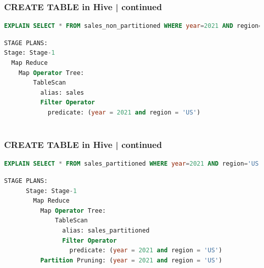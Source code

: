 \begin{frame}[fragile]
	\frametitle{CREATE TABLE in Hive | continued}
	\vspace{-0.6cm}
	\begin{tcolorbox}[colback=white,colframe=black,title= Part 5: Table Partitions]
	\small
	\vspace{-0.3cm}
\begin{lstlisting}[caption={Explain Plan Command for Non-Partitioned Table },language=SQL]
EXPLAIN SELECT * FROM sales_non_partitioned WHERE year=2021 AND region='US';
\end{lstlisting}
\vspace{-0.5cm}
\begin{lstlisting}[caption={Explain Plan Command for Non-Partitioned Table },language=SQL]
STAGE PLANS:
Stage: Stage-1
  Map Reduce
    Map Operator Tree:
        TableScan
          alias: sales
          Filter Operator
            predicate: (year = 2021 and region = 'US')
 
\end{lstlisting}
\end{tcolorbox}
	
\end{frame}
\begin{frame}[fragile]
	\frametitle{CREATE TABLE in Hive | continued}
	\vspace{-0.6cm}
	\begin{tcolorbox}[colback=white,colframe=black,title= Part 5: Table Partitions]
	\small
	\vspace{-0.3cm}
\begin{lstlisting}[caption={Explain Plan Command for Partitioned Table },language=SQL]
EXPLAIN SELECT * FROM sales_partitioned WHERE year=2021 AND region='US';
\end{lstlisting}
	\vspace{-0.5cm}
\begin{lstlisting}[caption={Explain Plan Command for Partitioned Table },language=SQL]
    STAGE PLANS:
      Stage: Stage-1
        Map Reduce
          Map Operator Tree:
              TableScan
                alias: sales_partitioned
                Filter Operator
                  predicate: (year = 2021 and region = 'US')
          Partition Pruning: (year = 2021 and region = 'US')
\end{lstlisting}
\end{tcolorbox}
	
\end{frame}
